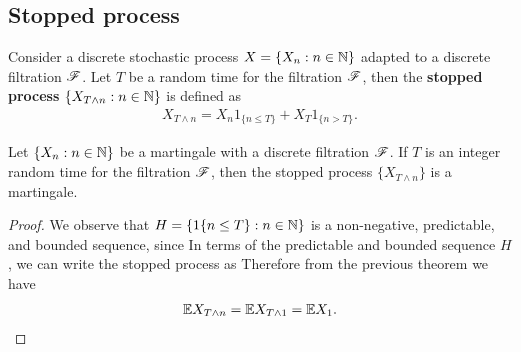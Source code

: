 \documentclass[a4paper,10pt,english]{article}
\begin{document}
\begin{thm}
\subsection{Stopped process}
Consider a discrete stochastic process $X = \{X_n: n\in \mathbb{N}\}$ adapted to a discrete filtration $\mathscr{F}$. 
Let $T$ be a random time for the filtration $\mathscr{F}$, 
then the \textbf{stopped process} $\{X_{T\wedge n}: n \in \mathbb{N}\}$ is defined as 
\begin{align*}
X_{T\wedge n} = X_n1_{\{n \leq T\}} + X_T1_{\{n > T\}}.
\end{align*}
\begin{prop}
Let  $\{X_n: n\in \mathbb{N}\}$ be a martingale with a discrete filtration $\mathscr{F}$. 
If $T$ is an integer random time for the filtration $\mathscr{F}$, 
then the stopped process $\{X_{T\wedge n}\}$ is a martingale. 
\end{prop}
\begin{proof}
We observe that $H = \{1\{n\leq T\}: n \in \mathbb{N}\}$ is a non-negative, predictable, and bounded sequence, since 
In terms of the predictable and bounded sequence $H$, we can write the stopped process as
Therefore from the previous theorem we have 
\begin{align*}
      \mathbb{E} X_{T\wedge n} =\mathbb{E} X_{T\wedge 1} =\mathbb{E} X_{1}. 
\end{align*}



\end{proof}
\end{thm}
\end{document}
